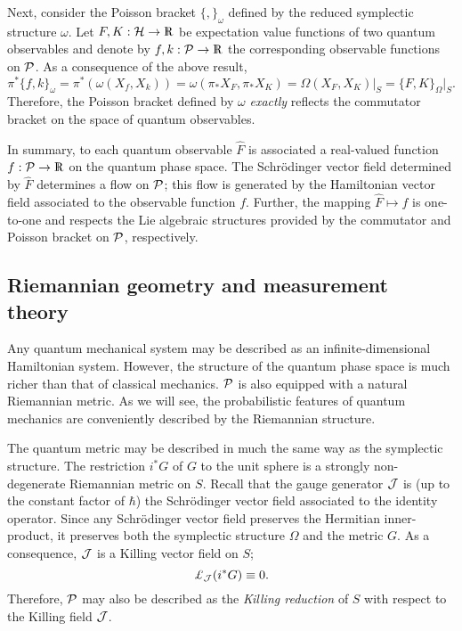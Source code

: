 \documentclass[12pt,aps,eqsecnum,tighten]{revtex4-2}
\def\be{\begin{equation}}
\def\ee{\end{equation}}
\def\H{{\cal H}}
\def\P{{\cal P}}
\def\w{\omega}
\def\W{\Omega}
\def\J{{\cal J}}
\newcommand{\lie}[1]{{\pounds}_{#1}}
\newcommand{\hvf}[1]{{X_{#1}}}
\def\Rl{{\mathchoice 
{\setbox0=\hbox{$\displaystyle\rm R$}\hbox{\hbox to0pt
{\kern0.4\wd0\vrule height0.9\ht0\hss}\box0}}
{\setbox0=\hbox{$\textstyle\rm R$}\hbox{\hbox to0pt
{\kern0.4\wd0\vrule height0.9\ht0\hss}\box0}}
{\setbox0=\hbox{$\scriptstyle\rm R$}\hbox{\hbox to0pt
{\kern0.4\wd0\vrule height0.9\ht0\hss}\box0}}
{\setbox0=\hbox{$\scriptscriptstyle\rm R$}\hbox{\hbox to0pt
{\kern0.4\wd0\vrule height0.9\ht0\hss}\box0}}}}
\def\Rl{{\mathchoice
{\setbox0=\hbox{$\displaystyle\rm R$}\hbox{\hbox to0pt
{\kern0.4\wd0\vrule height0.9\ht0\hss}\box0}}
{\setbox0=\hbox{$\textstyle\rm R$}\hbox{\hbox to0pt
{\kern0.4\wd0\vrule height0.9\ht0\hss}\box0}}
{\setbox0=\hbox{$\scriptstyle\rm R$}\hbox{\hbox to0pt
{\kern0.4\wd0\vrule height0.9\ht0\hss}\box0}}
{\setbox0=\hbox{$\scriptscriptstyle\rm R$}\hbox{\hbox to0pt
{\kern0.4\wd0\vrule height0.9\ht0\hss}\box0}}}}
\def\R{\Rl}
\begin{document}
Next, consider the Poisson bracket $\{ , \}_\w$ defined by the reduced
symplectic structure $\w$.  Let $F, K :\H \rightarrow \R$ be
expectation value functions of two quantum observables and denote by
$f,k:\P \rightarrow \R$ the corresponding observable functions on
$\P$.  As a consequence of the above result,
%
\be \label{pb_on_P}
\pi^*\{ f, k \}_\w = \pi^*( \w( \hvf{f}, \hvf{k} ) )
= \w( \pi_*\hvf{F}, \pi_*\hvf{K} )
= \W( \hvf{F}, \hvf{K} )\big|_S
= \{ F, K \}_\W\big|_S.
\ee
%
Therefore, the Poisson bracket defined by $\w$ {\em exactly} reflects
the commutator bracket on the space of quantum observables.

In summary, to each quantum observable $\hat{F}$ is associated a
real-valued function $f:\P \rightarrow \R$ on the quantum phase space.
The Schr\"odinger vector field determined by $\hat{F}$ determines a
flow on $\P$; this flow is generated by the Hamiltonian vector field
associated to the observable function $f$.  Further, the mapping
$\hat{F} \mapsto f$ is one-to-one and respects the Lie algebraic
structures provided by the commutator and Poisson bracket on $\P$,
respectively.


\subsection{Riemannian geometry and measurement theory}
\label{sec2.C}

Any quantum mechanical system may be described as an
infinite-dimensional Hamiltonian system.  However, the structure of
the quantum phase space is much richer than that of classical
mechanics.  $\P$ is also equipped with a natural Riemannian metric.
As we will see, the probabilistic features of quantum mechanics are
conveniently described by the Riemannian structure.

The quantum metric may be described in much the same way as the
symplectic structure.  The restriction $i^*G$ of $G$ to the unit
sphere is a strongly non-degenerate Riemannian metric on $S$.  Recall
that the gauge generator $\J$ is (up to the constant factor of
$\hbar$) the Schr\"odinger vector field associated to the identity
operator.  Since any Schr\"odinger vector field preserves the
Hermitian inner-product, it preserves both the symplectic structure
$\W$ and the metric $G$.  As a consequence, $\J$ is a Killing vector
field on $S$;
%
\be
	\lie{\J} (i^*G) \equiv 0.
\ee
%
Therefore, $\P$ may also be described as the {\em Killing
reduction}\cite{geroch} of $S$ with respect to the Killing field $\J$.
\end{document}

